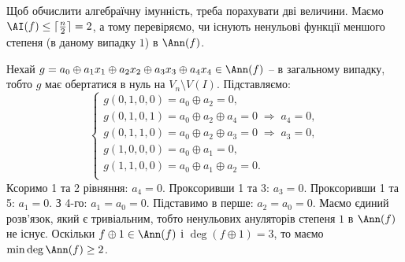 Щоб обчислити алгебраїчну імунність, треба порахувати дві величини. Маємо $\AI(f) \leq \lceil \frac{n}{2} \rceil = 2$, 
а тому перевіряємо, чи існують ненульові функції меншого степеня (в даному випадку $1$) в $\Ann(f)$.

Нехай $g = a_0 \oplus a_1 x_1 \oplus a_2 x_2 \oplus a_3 x_3 \oplus a_4 x_4 \in \Ann(f)$ -- в загальному випадку, тобто $g$
має обертатися в нуль на $V_{n} \setminus V(I)$. Підставляємо:
\begin{equation*}
    \begin{cases}
        g(0,1,0,0) = a_0 \oplus a_2 = 0,                                    \\
        g(0,1,0,1) = a_0 \oplus a_2 \oplus a_4 = 0 \;\Rightarrow\; a_4 = 0, \\
        g(0,1,1,0) = a_0 \oplus a_2 \oplus a_3 = 0 \;\Rightarrow\; a_3 = 0, \\
        g(1,0,0,0) = a_0 \oplus a_1 = 0,                                    \\
        g(1,1,0,0) = a_0 \oplus a_1 \oplus a_2 = 0.                         \\
    \end{cases}
\end{equation*}
Ксоримо 1 та 2 рівняння: $a_4 = 0$. Проксоривши 1 та 3: $a_3 = 0$. Проксоривши 1 та 5: $a_1 = 0$. З 4-го: 
$a_1 = a_0 = 0$. Підставимо в перше: $a_2 = a_0 = 0$. Маємо єдиний розв'язок, який є тривіальним, тобто 
ненульових ануляторів степеня $1$ в $\Ann(f)$ не існує. Оскільки $f \oplus 1 \in \Ann(f)$ і $\deg(f \oplus 1) = 3$, 
то маємо $\min \deg \Ann(f) \geq 2$.

